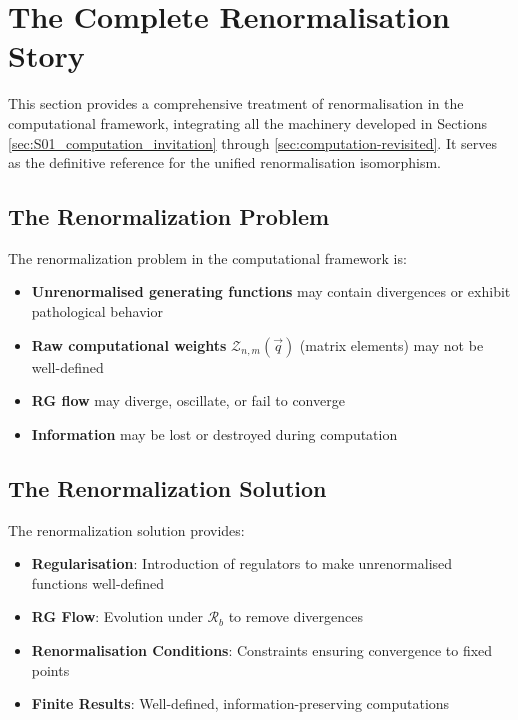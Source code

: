 
\section{The Complete Renormalisation Story}
\label{sec:complete-renormalization}

This section provides a comprehensive treatment of renormalisation in the computational framework, integrating all the machinery developed in Sections \ref{sec:S01_computation_invitation} through \ref{sec:computation-revisited}. It serves as the definitive reference for the unified renormalisation isomorphism.

\subsection{The Renormalization Problem}

\begin{definition}
\label{def:renorm-problem}
The renormalization problem in the computational framework is:
\begin{itemize}
\item \textbf{Unrenormalised generating functions} may contain divergences or exhibit pathological behavior
\item \textbf{Raw computational weights} $\mathcal{Z}_{n,m}(\vec{q})$ (matrix elements) may not be well-defined
\item \textbf{RG flow} may diverge, oscillate, or fail to converge
\item \textbf{Information} may be lost or destroyed during computation
\end{itemize}
\end{definition}

\subsection{The Renormalization Solution}

\begin{definition}
\label{def:renorm-solution}
The renormalization solution provides:
\begin{itemize}
\item \textbf{Regularisation}: Introduction of regulators to make unrenormalised functions well-defined
\item \textbf{RG Flow}: Evolution under $\mathcal{R}_b$ to remove divergences
\item \textbf{Renormalisation Conditions}: Constraints ensuring convergence to fixed points
\item \textbf{Finite Results}: Well-defined, information-preserving computations
\end{itemize}
\end{definition}

